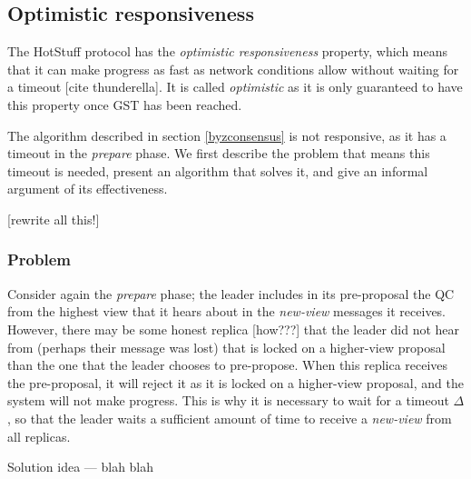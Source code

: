 \subsection{Optimistic responsiveness} \label{optresponsive}
The HotStuff protocol has the \textit{optimistic responsiveness} property, which means that it can make progress as fast as network conditions allow without waiting for a timeout [cite thunderella]. It is called \textit{optimistic} as it is only guaranteed to have this property once GST has been reached.

The algorithm described in section \ref{byzconsensus} is not responsive, as it has a timeout in the \textit{prepare} phase. We first describe the problem that means this timeout is needed, present an algorithm that solves it, and give an informal argument of its effectiveness.

[rewrite all this!]

\subsubsection{Problem}
Consider again the \textit{prepare} phase; the leader includes in its pre-proposal the QC from the highest view that it hears about in the \textit{new-view} messages it receives. However, there may be some honest replica [how???] that the leader did not hear from (perhaps their message was lost) that is locked on a higher-view proposal than the one that the leader chooses to pre-propose. When this replica receives the pre-proposal, it will reject it as it is locked on a higher-view proposal, and the system will not make progress. This is why it is necessary to wait for a timeout $\Delta$, so that the leader waits a sufficient amount of time to receive a \textit{new-view} from all replicas.

Solution idea --- blah blah

